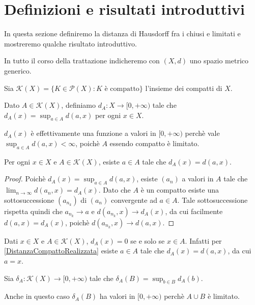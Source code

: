 \section{Definizioni e risultati introduttivi}
In questa sezione definiremo la distanza di Hausdorff fra i chiusi e limitati e mostreremo qualche risultato introduttivo.

In tutto il corso della trattazione indicheremo con $(X,d)$ uno spazio metrico generico.

\begin{definition}
	Sia $\mathcal{K}(X)=\{K\in \mathcal{P}(X) : K \text{ è compatto}\}$ l'insieme dei compatti di $X$.
\end{definition}

\begin{definition}
	Dato $A\in \mathcal{K}(X)$, definiamo $d_A: X\to [0,+\infty)$ tale che $d_A(x)=\sup_{a\in A}d(a,x)$ per ogni $x\in X$.
\end{definition}

\begin{remark}
	$d_A(x)$ è effettivamente una funzione a valori in $[0,+\infty)$ perchè vale $\sup_{a\in A}d(a,x)<\infty$, poichè $A$ essendo compatto è limitato.
\end{remark}

\begin{lemma}\label{DistanzaCompattoRealizzata}
	Per ogni $x\in X$ e $A \in \mathcal{K}(X)$, esiste $a\in A$ tale che $d_A(x)=d(a,x)$.
\end{lemma}
\begin{proof}
	Poichè $d_A(x)=\sup_{a\in A} d(a,x)$, esiste $(a_n)$ a valori in $A$ tale che $\lim_{n\to\infty}d(a_n,x)=d_A(x)$. Dato che $A$ è un compatto esiste una sottosuccessione $(a_{n_k})$ di $(a_n)$ convergente ad $a\in A$. Tale sottosuccessione rispetta quindi che $a_{n_k}\to a$ e $d(a_{n_k},x)\to d_A(x)$, da cui facilmente $d(a,x)=d_A(x)$, poichè $d(a_{n_k},x)\to d(a,x)$.
\end{proof}
\begin{remark}\label{DistanzaCompattoAppartenenza}
	Dati $x\in X$ e $A \in \mathcal{K}(X)$, $d_A(x)=0$ se e solo se $x\in A$. Infatti per \cref{DistanzaCompattoRealizzata} esiste $a\in A$ tale che $d_A(x)=d(a,x)$, da cui $a=x$.
\end{remark}

\begin{definition}
	Sia $\delta_A:\mathcal{K}(X)\to [0,+\infty)$ tale che $\delta_A(B)=\sup_{b\in B} d_A(b)$.
\end{definition}
\begin{remark}
	Anche in questo caso $\delta_A(B)$ ha valori in $[0,+\infty)$ perchè $A\cup B$ è limitato.
\end{remark}

